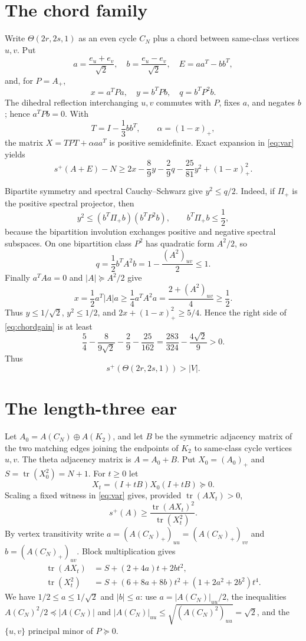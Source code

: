 \documentclass[11pt]{article}
\begin{document}
\section{The chord family}
Write $\Theta(2r,2s,1)$ as an even cycle $C_N$ plus a chord between
same-class vertices $u,v$.  Put
\[
 a=\frac{e_u+e_v}{\sqrt2},\quad b=\frac{e_u-e_v}{\sqrt2},\quad
 E=aa^T-bb^T,
\]
and, for $P=A_+$,
\[
 x=a^TPa,\quad y=b^TPb,\quad q=b^TP^2b.
\]
The dihedral reflection interchanging $u,v$ commutes with $P$, fixes $a$, and
negates $b$; hence $a^TPb=0$.  With
\[
 T=I-\frac13bb^T,\qquad \alpha=(1-x)_+,
\]
the matrix $X=TPT+\alpha aa^T$ is positive semidefinite.  Exact expansion in
\eqref{eq:var} yields
\begin{equation}\label{eq:chordgain}
 s^+(A+E)-N\ge
 2x-\frac89y-\frac29q-\frac{25}{81}y^2+(1-x)_+^2.
\end{equation}

Bipartite symmetry and spectral Cauchy--Schwarz give $y^2\le q/2$.  Indeed,
if $\Pi_+$ is the positive spectral projector, then
\[
y^2\le(b^T\Pi_+b)(b^TP^2b),\qquad b^T\Pi_+b\le\frac12,
\]
because the bipartition involution exchanges positive and negative spectral
subspaces.  On one bipartition class $P^2$ has quadratic form $A^2/2$, so
\[
q=\frac12b^TA^2b=1-\frac{(A^2)_{uv}}2\le1.
\]
Finally $a^TAa=0$ and $|A|\succeq A^2/2$ give
\[
x=\frac12a^T|A|a\ge\frac14a^TA^2a
=\frac{2+(A^2)_{uv}}4\ge\frac12.
\]
Thus $y\le1/\sqrt2$, $y^2\le1/2$, and
$2x+(1-x)_+^2\ge5/4$.  Hence the right side of
\eqref{eq:chordgain} is at least
\[
 \frac54-\frac8{9\sqrt2}-\frac29-\frac{25}{162}
 =\frac{283}{324}-\frac{4\sqrt2}{9}>0.
\]
Thus
\begin{equation}\label{eq:eveneven1}
 s^+(\Theta(2r,2s,1))>|V|.
\end{equation}

\section{The length-three ear}
Let $A_0=A(C_N)\oplus A(K_2)$, and let $B$ be the symmetric adjacency matrix
of the two matching edges joining the endpoints of $K_2$ to same-class cycle
vertices $u,v$.  The theta adjacency matrix is $A=A_0+B$.
Put $X_0=(A_0)_+$ and $S=\operatorname{tr}(X_0^2)=N+1$.  For $t\ge0$ let
\[
 X_t=(I+tB)X_0(I+tB)\succeq0.
\]
Scaling a fixed witness in \eqref{eq:var} gives, provided
$\operatorname{tr}(AX_t)>0$,
\begin{equation}\label{eq:ratio}
 s^+(A)\ge\frac{\operatorname{tr}(AX_t)^2}{\operatorname{tr}(X_t^2)}.
\end{equation}
By vertex transitivity write
$a=(A(C_N)_+)_{uu}=(A(C_N)_+)_{vv}$ and
$b=(A(C_N)_+)_{uv}$.  Block multiplication gives
\begin{align}
 \operatorname{tr}(AX_t)&=S+(2+4a)t+2bt^2,\label{eq:num}\\
 \operatorname{tr}(X_t^2)&=S+(6+8a+8b)t^2
 +(1+2a^2+2b^2)t^4.\label{eq:den}
\end{align}
We have $1/2\le a\le1/\sqrt2$ and $|b|\le a$: use
$a=|A(C_N)|_{uu}/2$, the inequalities
$A(C_N)^2/2\preceq|A(C_N)|$ and
$|A(C_N)|_{uu}\le\sqrt{(A(C_N)^2)_{uu}}=\sqrt2$, and the
$\{u,v\}$ principal minor of $P\succeq0$.
\end{document}
